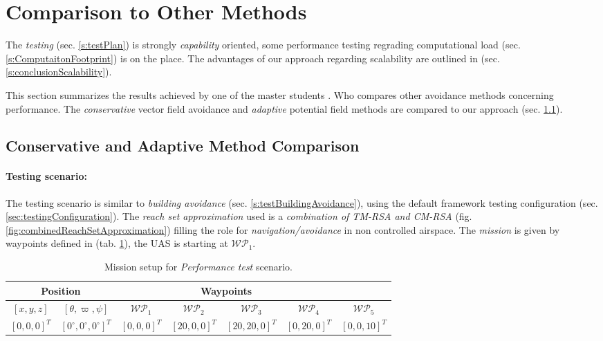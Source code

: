 \newpage
\section{Comparison to Other Methods}\label{s:OtherMethodsComparison}
\noindent The \emph{testing} (sec. \ref{s:testPlan}) is strongly \emph{capability} oriented, some performance testing regrading computational load (sec. \ref{s:ComputaitonFootprint}) is on the place. The advantages of our approach regarding scalability are outlined in (sec. \ref{s:conclusionScalability}).

This section summarizes the results achieved by one of the master students \cite{hrdlik2018}. Who compares other avoidance methods concerning performance. The  \emph{conservative }vector field avoidance \cite{borenstein1991vector} and \emph{adaptive} potential field \cite{koren1991potential} methods are compared to our approach (sec. \ref{s:conservativeComparison}).

\subsection{Conservative and Adaptive Method Comparison}\label{s:conservativeComparison}
\paragraph{Testing scenario:} The testing scenario is similar to \emph{building avoidance} (sec. \ref{s:testBuildingAvoidance}), using the default framework testing configuration (sec. \ref{sec:testingConfiguration}). The \emph{reach set approximation} used is a \emph{combination of TM-RSA and CM-RSA} (fig. \ref{fig:combinedReachSetApproximation}) filling the role for \emph{navigation/avoidance} in non controlled airspace. The \emph{mission} is given by waypoints defined in (tab. \ref{tab:missionSetupForPErformanceTest}), the UAS is starting at $\mathscr{WP}_1$.

\begin{table}[H]
	\centering
	\begin{tabular}{c|c||c|c|c|c|c}
		\multicolumn{2}{c||}{Position} & \multicolumn{4}{c}{Waypoints} \\\hline
		$[x,y,z]$     & $[\theta,\varpi,\psi]$           & $\mathscr{WP}_1$   & $\mathscr{WP}_2$   & $\mathscr{WP}_3$   & $\mathscr{WP}_4$    & $\mathscr{WP}_5$\\\hline\hline
		$[0,0,0]^T $       & $[0^\circ,0^\circ,0^\circ]^T$ & $[0,0,0]^T$ & $[20,0,0]^T$       & $[20,20,0]^T$       & $[0,20,0]^T$       & $[0,0,10]^T$       
	\end{tabular}
	\caption{Mission setup for \emph{Performance test} scenario.}
	\label{tab:missionSetupForPErformanceTest}
\end{table}

